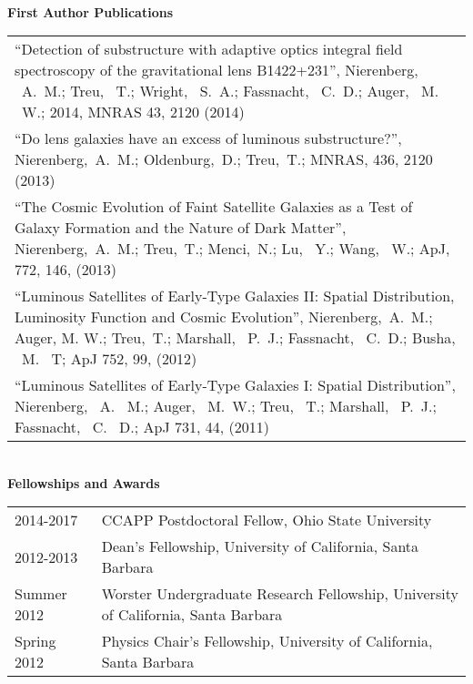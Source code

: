 \documentclass[12pt]{ucthesis}
\begin{document}
\begin{frontmatter}
\begin{flushleft}
\mbox{ } \\

{\bf First Author Publications}

\begin{tabular}{@{}p{5.6in}}
\smallskip
``Detection of substructure with adaptive optics integral field spectroscopy of the gravitational lens B1422+231'', Nierenberg, ~A.~M.; Treu, ~T.; Wright, ~S.~A.; Fassnacht, ~C.~D.; Auger, ~M. ~W.; 2014, MNRAS 43, 2120 (2014) \\
\smallskip

``Do lens galaxies have an excess of luminous substructure?'', Nierenberg,~A.~M.; Oldenburg,~D.; Treu,~T.; MNRAS, 436, 2120 (2013) \\
\smallskip

``The Cosmic Evolution of Faint Satellite Galaxies as a Test of Galaxy Formation and the Nature of Dark Matter'', Nierenberg,~A.~M.; Treu,~T.; Menci,~N.; Lu, ~Y.; Wang, ~W.; ApJ, 772, 146, (2013) \\
\smallskip

``Luminous Satellites of Early-Type Galaxies II: Spatial Distribution, Luminosity Function and Cosmic Evolution'', Nierenberg,~A.~M.; Auger, M. W.; Treu,~T.; Marshall, ~P.~J.; Fassnacht, ~C.~D.; Busha, ~M. ~T; ApJ 752, 99, (2012) \\
\smallskip

``Luminous Satellites of Early-Type Galaxies I: Spatial Distribution'', Nierenberg, ~A. ~M.; Auger, ~M.~W.; Treu, ~T.; Marshall, ~P.~J.; Fassnacht, ~C. ~D.; ApJ 731, 44, (2011)
\end{tabular}

\mbox{ } \\

\clearpage
{\bf Fellowships and Awards}
\smallskip
\begin{tabular}{@{}p{1in}@{}p{4.6in}}
2014-2017 & CCAPP Postdoctoral Fellow, Ohio State University \\
2012-2013 & Dean's Fellowship, University of California, Santa Barbara \\
Summer 2012 & Worster Undergraduate Research Fellowship, University of California, Santa Barbara \\
Spring 2012 & Physics Chair's Fellowship, University of California, Santa Barbara \\
\end{tabular}

\mbox{ } \\


\end{flushleft}
\end{frontmatter}
\end{document}

